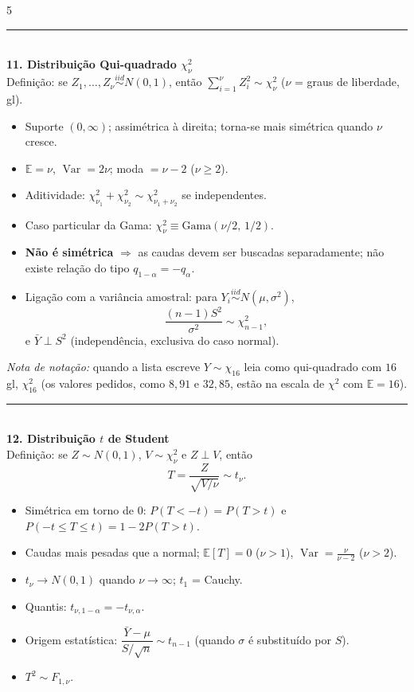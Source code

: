 \documentclass[a4paper,8pt]{extarticle}
\newcommand{\tit}[1]{\vspace{2pt}\textcolor{azul}{\rule{\linewidth}{0.6pt}}\\[1pt]\textbf{\textcolor{azul}{#1}}\\[1pt]}
\newcommand{\E}{\mathbb{E}}
\newcommand{\Var}{\operatorname{Var}}
\newcommand{\ind}{\stackrel{iid}{\sim}}
\begin{document}
\begin{multicols*}{5}
\tit{11. Distribuição Qui-quadrado $\chi^2_{\nu}$}
Definição: se $Z_1,\dots,Z_\nu\ind N(0,1)$, então $\sum_{i=1}^{\nu}Z_i^2\sim\chi^2_\nu$ ($\nu$ = graus de liberdade, gl).
\begin{itemize}
\item Suporte $(0,\infty)$; assimétrica à direita; torna-se mais simétrica quando $\nu$ cresce.
\item $\E=\nu$, $\Var=2\nu$; moda $=\nu-2$ ($\nu\ge2$).
\item Aditividade: $\chi^2_{\nu_1}+\chi^2_{\nu_2}\sim\chi^2_{\nu_1+\nu_2}$ se independentes.
\item Caso particular da Gama: $\chi^2_\nu \equiv \text{Gama}(\nu/2,\,1/2)$.
\item \textbf{Não é simétrica} $\Rightarrow$ as caudas devem ser buscadas separadamente; não existe relação do tipo $q_{1-\alpha}=-q_\alpha$.
\item Ligação com a variância amostral: para $Y_i\ind N(\mu,\sigma^2)$,
\[\frac{(n-1)S^2}{\sigma^2}\sim\chi^2_{n-1},\]
e $\bar Y \perp S^2$ (independência, exclusiva do caso normal).
\end{itemize}
\emph{Nota de notação:} quando a lista escreve $Y\sim\chi_{16}$ leia como qui-quadrado com $16$ gl, $\chi^2_{16}$ (os valores pedidos, como $8{,}91$ e $32{,}85$, estão na escala de $\chi^2$ com $\E=16$).

\tit{12. Distribuição $t$ de Student}
Definição: se $Z\sim N(0,1)$, $V\sim\chi^2_\nu$ e $Z\perp V$, então
\[T=\frac{Z}{\sqrt{V/\nu}}\sim t_\nu .\]
\begin{itemize}
\item Simétrica em torno de $0$: $P(T<-t)=P(T>t)$ e $P(-t\le T\le t)=1-2P(T>t)$.
\item Caudas mais pesadas que a normal; $\E[T]=0$ ($\nu>1$), $\Var=\frac{\nu}{\nu-2}$ ($\nu>2$).
\item $t_\nu\to N(0,1)$ quando $\nu\to\infty$; $t_1$ = Cauchy.
\item Quantis: $t_{\nu,1-\alpha}=-t_{\nu,\alpha}$.
\item Origem estatística: $\dfrac{\bar Y-\mu}{S/\sqrt n}\sim t_{n-1}$ (quando $\sigma$ é substituído por $S$).
\item $T^2\sim F_{1,\nu}$.
\end{itemize}


\end{multicols*}
\end{document}
